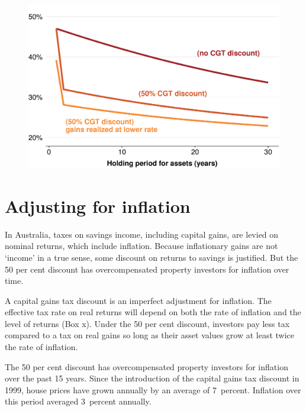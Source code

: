 \documentclass{grattan}\usepackage[]{graphicx}\usepackage[]{color}
\begin{document}
\begin{figure}
\includegraphics[width=\columnwidth]{CGT-NG-atlas//delaying-realization-causes-reduction-in-effective-tax-rate-1}
\end{figure}

\section{Adjusting for inflation}
In Australia, taxes on savings income, including capital gains, are levied on nominal returns, which include inflation. Because inflationary gains are not `income' in a true sense,  some discount on returns to savings is justified. But the 50 per cent discount has overcompensated property investors for inflation over time. 

A capital gains tax discount is an imperfect adjustment for inflation. The effective tax rate on real returns will depend on both the rate of inflation and the level of returns (Box x).  Under the 50 per cent discount, investors pay less tax compared to a tax on real gains so long as their asset values grow at least twice the rate of inflation. 






The 50 per cent discount has overcompensated property investors for inflation over the past 15 years. Since the introduction of the capital gains tax discount in 1999, house prices have grown annually by an average of 7~percent.  Inflation over this period averaged 3~percent annually. 
\end{document}
